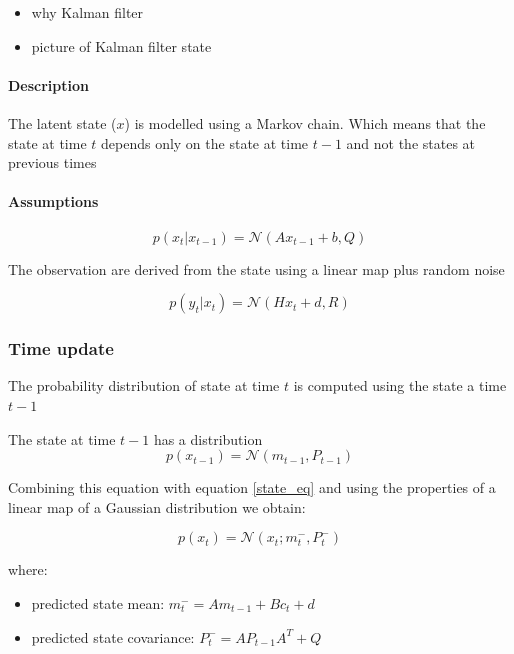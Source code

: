 \documentclass{article}
\let\Oldsubsubsection\subsubsection
\renewcommand{\subsubsection}{\FloatBarrier\Oldsubsubsection}
\begin{document}
\begin{itemize}
    \item why Kalman filter
    \item picture of Kalman filter state
\end{itemize}

\paragraph{Description}

The latent state ($x$) is modelled using a Markov chain. Which means that the state at time $t$ depends only on the state at time $t-1$ and not the states at previous times

\paragraph{Assumptions}

\begin{equation}\label{state_eq}
p(x_t | x_{t-1}) = \mathcal{N}(Ax_{t-1} + b, Q)
\end{equation}

The observation are derived from the state using a linear map plus random noise

\begin{equation}\label{obs_from_state}
    p(y_t | x_t) = \mathcal{N}(Hx_t + d, R)
\end{equation}


\subsubsection{Time update}

The probability distribution of state at time $t$ is computed using the state a time $t-1$

The state at time $t-1$ has a distribution $$ p(x_{t-1}) = \mathcal{N}(m_{t-1}, P_{t-1}) $$ 

Combining this equation with equation \ref{state_eq} and using the properties of a linear map of a Gaussian distribution we obtain:

\begin{equation}
    \label{filter_predict}p(x_t) = \mathcal{N}(x_t; m_t^-, P_t^-)
\end{equation} 

where:
\begin{itemize}
    \item predicted state mean: $m_t^- = Am_{t-1} + B c_t + d$   
    \item predicted state covariance: $P_t^- = AP_{t-1}A^T + Q$
\end{itemize}
\end{document}
